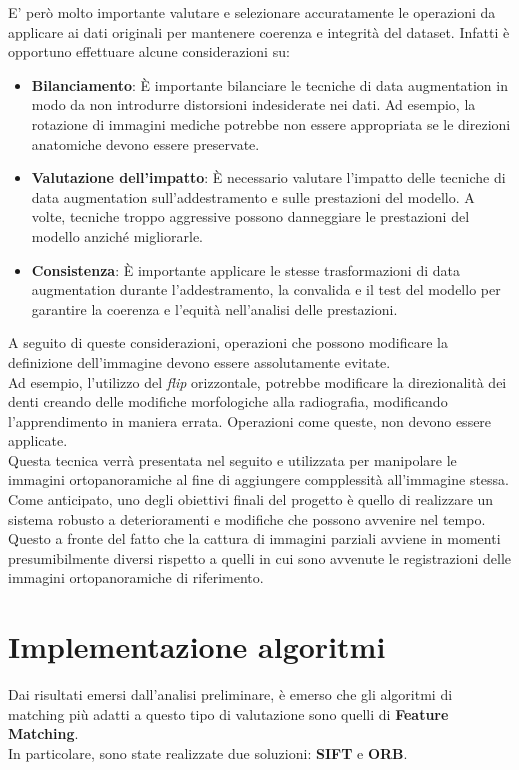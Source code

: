 \documentclass[12pt,a4paper,openright,twoside]{book}
\begin{document}
E' però molto importante valutare e selezionare accuratamente le operazioni da applicare ai dati originali per mantenere coerenza e integrità del dataset. Infatti è opportuno effettuare alcune considerazioni su:
\begin{itemize}
\item \textbf{Bilanciamento}: È importante bilanciare le tecniche di data augmentation in modo da non introdurre distorsioni indesiderate nei dati. Ad esempio, la rotazione di immagini mediche potrebbe non essere appropriata se le direzioni anatomiche devono essere preservate.

\item \textbf{Valutazione dell'impatto}: È necessario valutare l'impatto delle tecniche di data augmentation sull'addestramento e sulle prestazioni del modello. A volte, tecniche troppo aggressive possono danneggiare le prestazioni del modello anziché migliorarle.

\item \textbf{Consistenza}: È importante applicare le stesse trasformazioni di data augmentation durante l'addestramento, la convalida e il test del modello per garantire la coerenza e l'equità nell'analisi delle prestazioni.
\end{itemize}

A seguito di queste considerazioni, operazioni che possono modificare la definizione dell'immagine devono essere assolutamente evitate.\\
Ad esempio, l'utilizzo del {\itshape flip} orizzontale, potrebbe modificare la direzionalità dei denti creando delle modifiche morfologiche alla radiografia, modificando l'apprendimento in maniera errata. Operazioni come queste, non devono essere applicate.\\

Questa tecnica verrà presentata nel seguito e utilizzata per manipolare le immagini ortopanoramiche al fine di aggiungere compplessità all'immagine stessa. Come anticipato, uno degli obiettivi finali del progetto è quello di realizzare un sistema robusto a deterioramenti e modifiche che possono avvenire nel tempo. Questo a fronte del fatto che la cattura di immagini parziali avviene in momenti presumibilmente diversi rispetto a quelli in cui sono avvenute le registrazioni delle immagini ortopanoramiche di riferimento.

\section{Implementazione algoritmi}
Dai risultati emersi dall'analisi preliminare, è emerso che gli algoritmi di matching più adatti a questo tipo di valutazione sono quelli di \textbf{Feature Matching}.\\
In particolare, sono state realizzate due soluzioni: \textbf{SIFT} e \textbf{ORB}.\\
\end{document}

